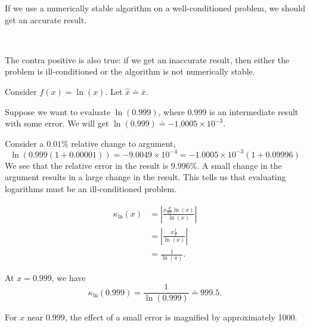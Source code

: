 \begin{remark}
    If we use a numerically stable algorithm on a well-conditioned problem, we should get an accurate result.

        {~~~}

    The contra positive is also true: if we get an inaccurate result, then either the problem is ill-conditioned or the algorithm is not numerically stable.
\end{remark}

\begin{example}
    Consider \( f(x) = \ln(x) \). Let \( \hat{x} \doteq \bar{x} \).

    Suppose we want to evaluate \( \ln(0.999) \), where \( 0.999 \) is an intermediate result with some error. We will get \( \ln(0.999) \doteq -1.0005 \times 10^{-3} \).

    Consider a \( 0.01\% \) relative change to argument, \[
        \ln(0.999(1+0.00001)) = -9.0049 \times 10^{-4} = -1.0005 \times 10^{-3} (1 + 0.09996)
    \] We see that the relative error in the result is \( 9.996\% \). A small change in the argument results in a large change in the result. This tells us that evaluating logarithms must be an ill-conditioned problem.

    \begin{align*}
        \kappa_{\ln}(x) & = \left| \frac{x \frac{d}{dx} \ln(x)}{\ln(x)} \right| \\
                        & = \left| \frac{x \frac{1}{x}}{\ln(x)} \right|         \\
                        & = \frac{1}{\ln(x)}.
    \end{align*}

    At \( x = 0.999 \), we have \[
        \kappa_{\ln}(0.999) = \frac{1}{\ln(0.999)} \doteq 999.5.
    \]

    For \( x \) near \( 0.999 \), the effect of a small error is magnified by approximately 1000.
\end{example}

